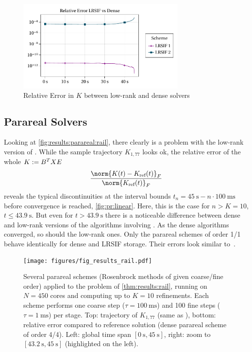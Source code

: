 \begin{figure}[tp]
  \centering
  \includegraphics[width=0.75\textwidth]{figures/fig_results_sequential_err.pdf}
  \caption{Relative Error in $K$ between low-rank and dense solvers}
\end{figure}

\subsection{Parareal Solvers}
\label{sec:results:parareal}

Looking at \autoref{fig:results:parareal:rail},
there clearly is a problem with the low-rank version of .
While the sample trajectory $K_{1,77}$ looks ok,
the relative error of the whole $K := B^T X E$
\begin{equation}
  \frac{\norm{K(t) - K_\text{ref}(t)}_F}{\norm{K_\text{ref}(t)}_F}
\end{equation}
reveals the typical discontinuities at the interval bounds
$t_n = \SI{45}{\second} - n \cdot \SI{100}{\milli\second}$
before convergence is reached,
\cf \autoref{fig:pr:linear}.
Here, this is the case for $n > K = 10$, \ie $t \leq \SI{43.9}{\second}$.
But even for $t > \SI{43.9}{\second}$ there is a noticeable difference between
dense and low-rank versions of the algorithms involving .
As the dense algorithms converged, so should the low-rank ones.
Only the parareal schemes of order 1/1 behave identically for dense and \ac{LRSIF} storage.
Their errors look similar to~\cite[Fig.~1]{Lang2015}.

\begin{figure}[t]
  \centering
  \texttt{[image: figures/fig\_results\_rail.pdf]}
  \caption[Parareal method applied to Rail problem]{%
    Several parareal schemes (Rosenbrock methods of given coarse/fine order)
    applied to the problem of \autoref{thm:results:rail},
    running on $N=450$ cores and
    computing up to $K=10$ refinements.
    Each scheme performs
    one coarse step ($\tau=\SI{100}{\milli\second}$) and
    100 fine steps ($\tau=\SI{1}{\milli\second}$) per stage.
    Top: trajectory of $K_{1,77}$ (same as \cite[Fig.~1]{Lang2015}),
    bottom: relative error compared to reference solution
    (dense parareal scheme of order 4/4).
    Left: global time span $[\SI{0}{\second}, \SI{45}{\second}]$,
    right: zoom to $[\SI[round-mode=off]{43.2}{\second}, \SI{45}{\second}]$ (highlighted on the left).
  }
  \label{fig:results:parareal:rail}
\end{figure}

